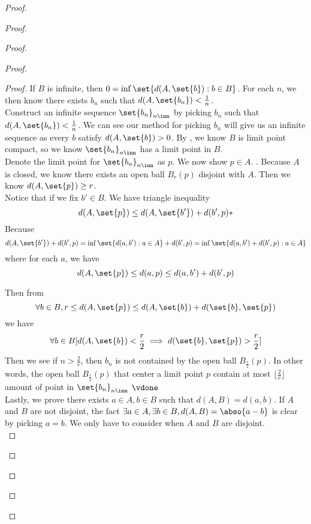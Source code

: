 \documentclass{report}
\begin{document}
\begin{proof}
\begin{proof}
\begin{proof}
\begin{proof}
\begin{proof}
If $B$ is infinite, then  $0=\inf \set{d(A,\set{b}):b\in B}$. For each $n$, we then know there exists  $b_n$ such that  $d(A,\set{b_n})<\frac{1}{n}$.\\


Construct an infinite sequence $\set{b_n}_{n\inn}$ by picking $b_n$ such that $d(A,\set{b_n})<\frac{1}{n}$. We can see our method for picking $b_n$ will give us an infinite sequence as every $b$  satisfy  $d(A,\set{b})>0$. By , we know $B$ is limit point compact, so we know $\set{b_n}_{n\inn}$ has a limit point in $B$.\\

Denote the limit point for $\set{b_n}_{n\inn}$ as $p$. We now show $p\in A$. . Because $A$ is closed, we know there exists an open ball  $B_r(p)$ disjoint with $A$. Then we know $d(A,\set{p})\geq r$. \\

Notice that if we fix $b'\in B$. We have triangle inequality
\begin{equation*}
d(A,\set{p})\leq d(A,\set{b'})+d(b',p)*
\end{equation*}
Because 
\begin{equation*}
d(A,\set{b'})+d(b',p)=\inf \set{d(a,b'):a \in A}+d(b',p)=\inf \set{d(a,b')+d(b',p):a \in A}
\end{equation*}
where for each $a$, we have
 \begin{equation*}
d(A,\set{p})\leq d(a,p)\leq d(a,b')+d(b',p)
\end{equation*}



Then from
\begin{equation*}
  \forall b\in B, r\leq d(A,\set{p})\leq d(A,\set{b})+d(\set{b},\set{p})
\end{equation*}
we have
\begin{equation*}
  \forall b\in B [d(A,\set{b})< \frac{r}{2}\implies d(\set{b},\set{p})>\frac{r}{2}]
\end{equation*}
Then we see if $n>\frac{2}{r}$, then $b_n$ is not contained by the open ball  $B_{\frac{r}{2}}(p)$. In other words, the open ball $B_{\frac{r}{2}}(p)$ that center a limit point $p$ contain at most $\lfloor \frac{2}{r}\rfloor$ amount of point in $\set{b_n}_{n\inn}$ \CaC$\vdone$\\

Lastly, we prove there exists $a\in A,b\in B$ such that $d(A,B)=d(a,b)$. If  $A$ and  $B$ are not disjoint, the fact $\exists a\in A,\exists b\in B, d(A,B)=\abso{a-b}$ is clear by picking $a=b$. We only have to consider when $A$ and $B$ are disjoint.\\


\end{proof}
\end{proof}
\end{proof}
\end{proof}
\end{proof}
\end{document}
